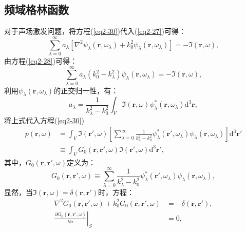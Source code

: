 \subsection{频域格林函数}
对于声场激发问题，将方程(\ref{eq2-30})代入(\ref{eq2-27})可得：
\begin{equation}\label{eq2-32}
  \sum_{\lambda = 0}^{\infty}a_{\lambda}[\nabla^{2}\psi_{\lambda}(\mathbf{r},\omega_{\lambda}) + k_{0}^{2}\psi_{\lambda}(\mathbf{r},\omega_{\lambda})]=-\mathfrak{I}(\mathbf{r},\omega),
\end{equation}
由方程(\ref{eq2-28})可得：
\begin{equation}\label{eq2-33}
  \sum_{\lambda = 0}^{\infty}a_{\lambda}(k_{0}^{2}-k_{\lambda}^{2})\psi_{\lambda}(\mathbf{r},\omega_{\lambda})=-\mathfrak{I}(\mathbf{r},\omega),
\end{equation}
利用$\psi_{\lambda}(\mathbf{r},\omega_{\lambda})$的正交归一性，有：
\begin{equation}\label{eq2-34}
  a_{\lambda}=\frac{1}{k_{\lambda}^{2}-k_{0}^{2}}\int_{V}\mathfrak{I}(\mathbf{r},\omega)\psi_{\lambda}^{*}(\mathbf{r},\omega_{\lambda})\mathrm{d}^{3}\mathbf{r},
\end{equation}
将上式代入方程(\ref{eq2-30})
\begin{equation}
\begin{split}
  p(\mathbf{r},\omega)&=\int_{V}\mathfrak{I}(\mathbf{r}',\omega)\left[\sum_{\lambda = 0}^{\infty}\frac{1}{k_{\lambda}^{2}-k_{0}^{2}}\psi_{\lambda}^{*}(\mathbf{r}',\omega_{\lambda})\psi_{\lambda}(\mathbf{r},\omega_{\lambda})\right]\mathrm{d}^{3}\mathbf{r}'\\
  &\equiv\int_{V}G_{0}(\mathbf{r},\mathbf{r}',\omega)\mathfrak{I}(\mathbf{r}',\omega)\mathrm{d}^{3}\mathbf{r}',
\end{split}
\end{equation}
其中，$G_0(\mathbf{r}, \mathbf{r}', \omega)$定义为：
\begin{equation}
  G_0(\mathbf{r}, \mathbf{r}', \omega) \equiv \sum_{\lambda = 0}^{\infty} \frac{1}{k_{\lambda}^{2} - k_{0}^{2}} \psi_{\lambda}^{*}(\mathbf{r}', \omega_{\lambda}) \psi_{\lambda}(\mathbf{r}, \omega_{\lambda}),
\end{equation}
显然，当$\mathfrak{I}(\mathbf{r}, \omega) = \delta(\mathbf{r}, \mathbf{r}')$时，方程：
\begin{equation}\label{eq2-27}
  \begin{split}
  \nabla^{2}G_{0}(\mathbf{r},\mathbf{r}',\omega)+k_{0}^{2}G_{0}(\mathbf{r},\mathbf{r}',\omega)&=-\delta(\mathbf{r},\mathbf{r}'),\\
  \left.\frac{\partial G_{0}(\mathbf{r},\mathbf{r}',\omega)}{\partial n}\right|_{S}&=0,
  \end{split}
\end{equation}
